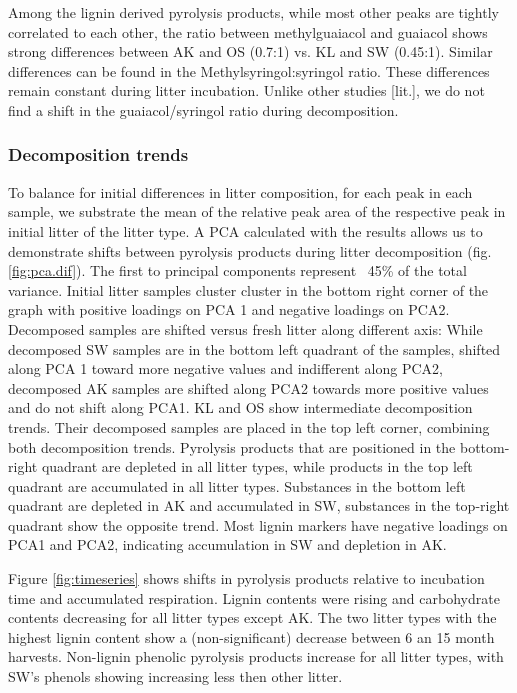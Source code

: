 Among the lignin derived pyrolysis products, while most other peaks are tightly correlated to each other, the ratio between methylguaiacol and guaiacol shows strong differences between AK and OS (0.7:1) vs. KL and SW (0.45:1). Similar differences can be found in the Methylsyringol:syringol ratio. These differences remain constant during litter incubation. Unlike other studies [lit.], we do not find a shift in the guaiacol/syringol ratio during decomposition.


\subsubsection{Decomposition trends}

To balance for initial differences in litter composition, for each peak in each sample, we substrate the mean of the relative peak area of the respective peak in initial litter of the litter type. A PCA calculated with the results allows us to demonstrate shifts between pyrolysis products during litter decomposition (fig. \ref{fig:pca.dif}). The first to principal components represent ~45\% of the total variance. Initial litter samples cluster cluster in the bottom right corner of the graph with positive loadings on PCA 1 and negative loadings on PCA2. Decomposed samples are shifted versus fresh litter along different axis: While decomposed SW samples are in the bottom left quadrant of the samples, shifted along PCA 1 toward more negative values and indifferent along PCA2, decomposed AK samples are shifted along PCA2 towards more positive values and do not shift along PCA1. KL and OS show intermediate decomposition trends. Their decomposed samples are placed in the top left corner, combining both decomposition trends.  
Pyrolysis products that are positioned in the bottom-right quadrant  are depleted in all litter types, while products in the top left quadrant are accumulated in all litter types. Substances in the bottom left quadrant are depleted in AK and accumulated in SW, substances in the top-right quadrant show the opposite trend. 
Most lignin markers have negative loadings on PCA1 and PCA2, indicating accumulation in SW and depletion in AK. 

Figure \ref{fig:timeseries} shows shifts in pyrolysis products relative to incubation time and accumulated respiration. Lignin contents were rising and carbohydrate contents decreasing for all litter types except AK. The two litter types with the highest lignin content show a (non-significant) decrease between 6 an 15 month harvests. Non-lignin phenolic pyrolysis products increase for all litter types, with SW's phenols showing increasing less then other litter.

